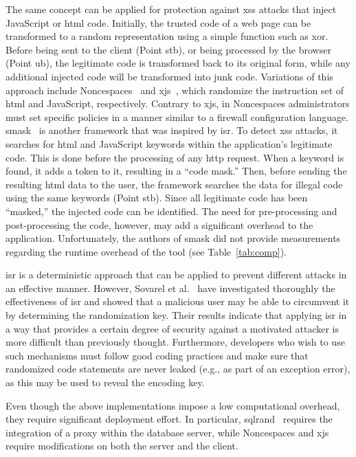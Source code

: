 \documentclass[10pt,journal,compsoc]{IEEEtran}
\begin{document}
The same concept can be applied for protection against
{\sc xss} attacks that inject JavaScript or {\sc html} code.
Initially, the trusted code of a web page can be transformed
to a random representation using a simple function such as {\sc xor}.
Before being sent to the client (Point {\sc s}t{\sc b}),
or being processed by the browser (Point {\sc ub}),
the legitimate code is transformed back to its original form,
while any additional injected code will be transformed into junk code.
Variations of this approach include
Noncespaces~\cite{GC09} and x{\sc js}~\cite{APKLM10}, which
randomize the instruction set of {\sc html} and JavaScript,
respectively. Contrary to x{\sc js}, in Noncespaces administrators
must set specific policies in a manner similar to a firewall
configuration language. {\sc sm}ask~\cite{JB07} is another
framework that was inspired by {\sc isr}. To detect {\sc xss}
attacks, it searches for {\sc html} and
JavaScript keywords within the application's legitimate code. This is
done before the processing of any {\sc http} request. When a keyword is found,
it adds a token to it, resulting in a ``code mask.'' Then, before
sending the resulting {\sc html} data to the user, the framework
searches the data for illegal code using the same keywords (Point
{\sc s}t{\sc b}). Since all legitimate code has been ``masked,'' the injected
code can be identified. The need for 
pre-processing and post-processing the code,
however, may add a significant overhead to the application.
Unfortunately, the authors of {\sc sm}ask did not provide measurements
regarding the runtime overhead of the tool (see
Table~\ref{tab:comp}).

{\sc isr} is a deterministic approach that can be applied to prevent
different attacks in an effective manner. However, Sovarel et
al.~\cite{SEP05} have investigated thoroughly the effectiveness of
{\sc isr} and showed that a malicious user may be able to circumvent
it by determining the randomization key. Their results indicate
that applying {\sc isr} in a way that provides a certain degree of
security against a motivated attacker is more difficult than
previously thought. Furthermore, developers who wish to use such
mechanisms must follow good coding practices and make sure that
randomized code statements are never leaked
(e.g., as part of an exception error),
as this may be used to reveal the encoding key.

Even though the above implementations impose a low computational
overhead, they require significant deployment effort. In particular,
{\sc sql}rand~\cite{BK04} requires the integration of
a proxy within the database
server, while Noncespaces and x{\sc js}~\cite{APKLM10}
require modifications on both the server and the client.
\end{document}
